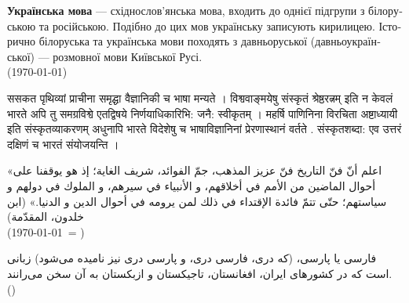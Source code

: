 \documentclass[a4paper]{article}
\begin{document}
\begin{ukrainian}
\textbf{Українська мова} — східнослов'янська мова, входить до однієї підгрупи з білоруською та російською. Подібно до цих мов українську записують кирилицею. Історично білоруська та українська мови походять з давньоруської (давньоукраїнської) — розмовної мови Київської Русі.\\
(\today)
\end{ukrainian}

\begin{sanskrit}
{\Large ससकत} पृथिव्यां प्राचीना समृद्घा वैज्ञानिकी च भाषा मन्यते । विश्ववाङ्‌मयेषु संस्कृतं श्रेष्ठरत्नम् इति न केवलं भारते अपि तु समग्रविश्वे एतद्विषये निर्णयाधिकारिभि: जनै: स्वीकृतम् । महर्षि पाणिनिना विरचिता अष्टाध्यायी इति संस्कृतव्याकरणम्‌ अधुनापि भारते विदेशेषु च भाषाविज्ञानिनां प्रेरणास्‍थानं वर्तते . संस्कृतशब्दा: एव उत्तरं दक्षिणं च भारतं संयोजयन्ति ।
\end{sanskrit}

\begin{Arabic}[]
«اعلم أنّ فنّ التاريخ فنّ عزيز المذهب، جمّ الفوائد، شريف الغاية؛ إذ هو يوقفنا على أحوال الماضين من الأمم في أخلاقهم، و الأنبياء في سيرهم، و الملوك في دولهم و سياستهم؛ حتّى تتمّ فائدة الإقتداء في ذلك لمن يرومه في أحوال الدين و الدنيا.» (ابن خلدون، المقدّمة)\\
(\today\ = \Hijritoday[0])
\end{Arabic}

\begin{farsi}
فارسی یا پارسی، (که دری، فارسی دری، و پارسی دری نیز نامیده می‌شود) زبانی است که
در کشورهای ایران، افغانستان، تاجیکستان و ازبکستان به آن سخن می‌رانند. \\
(\Jalalitoday)
\end{farsi}
\end{document}

